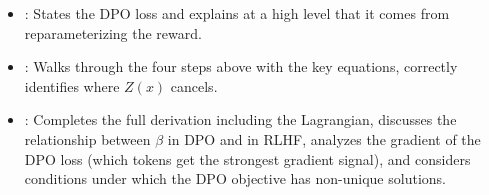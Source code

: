 \begin{interviewq}
\goodgreat
\begin{itemize}
\item {}: States the DPO loss and explains at a high level
  that it comes from reparameterizing the reward.
\item {}: Walks through the four steps above with the key
  equations, correctly identifies where $Z(x)$ cancels.
\item {}: Completes the full derivation including the
  Lagrangian, discusses the relationship between $\beta$ in DPO and in
  RLHF, analyzes the gradient of the DPO loss (which tokens get the
  strongest gradient signal), and considers conditions under which the
  DPO objective has non-unique solutions.
\end{itemize}

\end{interviewq}

